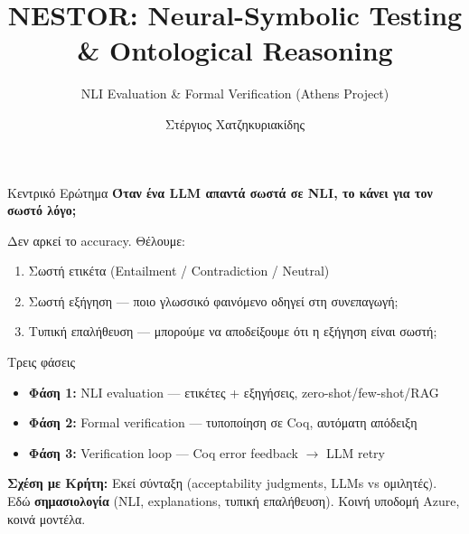\documentclass[aspectratio=169,10pt]{beamer}
\title{NESTOR: Neural-Symbolic Testing \& Ontological Reasoning}
\subtitle{NLI Evaluation \& Formal Verification (Athens Project)}
\author{Στέργιος Χατζηκυριακίδης}
\institute{Πανεπιστήμιο Κρήτης}
\date{}
\begin{document}
\begin{frame}
	\titlepage
\end{frame}

\begin{frame}{Κεντρικό Ερώτημα}
	\textbf{Όταν ένα LLM απαντά σωστά σε NLI, το κάνει για τον σωστό λόγο;}

	\vspace{0.3cm}
	Δεν αρκεί το accuracy. Θέλουμε:
	\begin{enumerate}
		\item Σωστή ετικέτα (Entailment / Contradiction / Neutral)
		\item Σωστή εξήγηση --- ποιο γλωσσικό φαινόμενο οδηγεί στη συνεπαγωγή;
		\item Τυπική επαλήθευση --- μπορούμε να αποδείξουμε ότι η εξήγηση είναι σωστή;
	\end{enumerate}

	\vspace{0.3cm}
	\begin{block}{Τρεις φάσεις}
		\begin{itemize}
			\item \textbf{Φάση 1:} NLI evaluation --- ετικέτες + εξηγήσεις, zero-shot/few-shot/RAG
			\item \textbf{Φάση 2:} Formal verification --- τυποποίηση σε Coq, αυτόματη απόδειξη
			\item \textbf{Φάση 3:} Verification loop --- Coq error feedback $\to$ LLM retry
		\end{itemize}
	\end{block}

	\vspace{0.2cm}
	\textbf{Σχέση με Κρήτη:} Εκεί σύνταξη (acceptability judgments, LLMs vs ομιλητές). Εδώ \textbf{σημασιολογία} (NLI, explanations, τυπική επαλήθευση). Κοινή υποδομή Azure, κοινά μοντέλα.
\end{frame}
\end{document}
